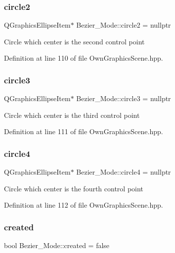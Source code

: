 \subsubsection{\texorpdfstring{circle2}{circle2}}
{\footnotesize\ttfamily Q\+Graphics\+Ellipse\+Item$\ast$ Bezier\+\_\+\+Mode\+::circle2 = nullptr}

Circle which center is the second control point 

Definition at line 110 of file Own\+Graphics\+Scene.\+hpp.

\mbox{\label{structBezier__Mode_a342d3b970c6049b615ef356a902c0781}} 
\subsubsection{\texorpdfstring{circle3}{circle3}}
{\footnotesize\ttfamily Q\+Graphics\+Ellipse\+Item$\ast$ Bezier\+\_\+\+Mode\+::circle3 = nullptr}

Circle which center is the third control point 

Definition at line 111 of file Own\+Graphics\+Scene.\+hpp.

\mbox{\label{structBezier__Mode_a6f26e1fe7da425063b792dab9f3c1099}} 
\subsubsection{\texorpdfstring{circle4}{circle4}}
{\footnotesize\ttfamily Q\+Graphics\+Ellipse\+Item$\ast$ Bezier\+\_\+\+Mode\+::circle4 = nullptr}

Circle which center is the fourth control point 

Definition at line 112 of file Own\+Graphics\+Scene.\+hpp.

\mbox{\label{structBezier__Mode_ae2573f8601e7d9f439d2bfbc11c34ae9}} 
\subsubsection{\texorpdfstring{created}{created}}
{\footnotesize\ttfamily bool Bezier\+\_\+\+Mode\+::created = false}

